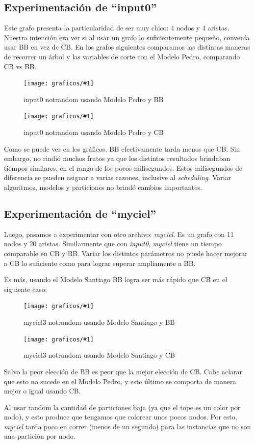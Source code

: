 \documentclass[a4paper, 10pt, twoside]{article}
\newcommand{\diagramavfig}[2]{%
  \begin{figure}[H]
    \texttt{[image: graficos/\#1]}%
    \caption{#2}
    \label{fig:#1}
  \end{figure}
}
\begin{document}
\subsection{Experimentación de ``input0''}

Este grafo presenta la particularidad de ser muy chico: 4 nodos y 4 aristas. Nuestra intención era ver si al usar un grafo lo suficientemente pequeño, convenía usar BB en vez de CB. En los grafos siguientes comparamos las distintas maneras de recorrer un árbol y las variables de corte con el Modelo Pedro, comparando CB vs BB.

\diagramavfig{input0_notrandom_1_bb_0_segunJuntada}{input0 notrandom usando Modelo Pedro y BB}
\diagramavfig{input0_notrandom_1_cb_0_segunJuntada}{input0 notrandom usando Modelo Pedro y CB}

Como se puede ver en los gráficos, BB efectivamente tarda menos que CB. Sin embargo, no rindió muchos frutos ya que los distintos resultados brindaban tiempos similares, en el rango de los pocos milisegundos. Estos milisegundos de diferencia se pueden asignar a varias razones, inclusive al \emph{scheduling}. Variar algoritmos, modelos y particiones no brindó cambios importantes.

\subsection{Experimentación de ``myciel''}

Luego, pasamos a experimentar con otro archivo: \emph{myciel}. Es un grafo con 11 nodos y 20 aristas. Similarmente que con \emph{input0}, \textit{myciel} tiene un tiempo comparable en CB y BB. Variar los distintos parámetros no puede hacer mejorar a CB lo suficiente como para lograr superar ampliamente a BB.

Es más, usando el Modelo Santiago BB logra ser más rápido que CB en el siguiente caso:

\diagramavfig{myciel3_notrandom_1_bb_1_segunJuntada}{myciel3 notrandom usando Modelo Santiago y BB}
\diagramavfig{myciel3_notrandom_1_cb_1_segunJuntada}{myciel3 notrandom usando Modelo Santiago y CB}

Salvo la peor elección de BB es peor que la mejor elección de CB. Cabe aclarar que esto no sucede en el Modelo Pedro, y este último se comporta de manera mejor o igual usando CB.

Al usar random la cantidad de particiones baja (ya que el tope es un color por nodo), y esto produce que tengamos que colorear unos pocos nodos. Por esto, \textit{myciel} tarda poco en correr (menos de un segundo) para las instancias que no son una partición por nodo.
\end{document}
